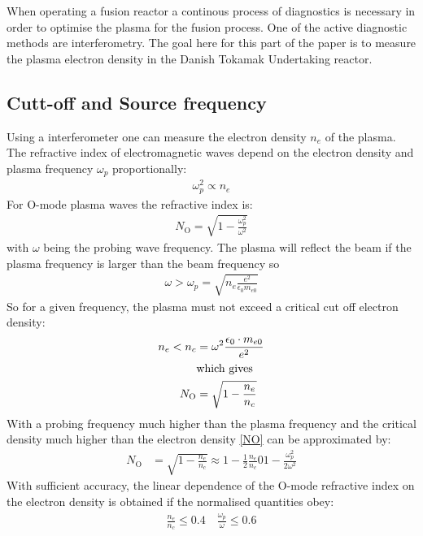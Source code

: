 When operating a fusion reactor a continous process of diagnostics is necessary in order to optimise the plasma for the fusion process. One of the active diagnostic methods are interferometry.
The goal here for this part of the paper is to measure the plasma electron density in the Danish Tokamak Undertaking reactor.
\subsection{Cutt-off and Source frequency}
Using a interferometer one can measure the electron density \(n_e\) of the plasma. The refractive index of electromagnetic waves depend on the electron density and plasma frequency \(\omega_p\) proportionally:
\begin{align}
	\omega_p^2 \propto n_e
\end{align}
For O-mode plasma waves the refractive index is:
\begin{align}
	N_{\mathrm{O}} = \sqrt{1-\frac{\omega_p^2}{\omega^2}}
\end{align}
with \(\omega\) being the probing wave frequency.
The plasma will reflect the beam if the plasma frequency is larger than the beam frequency so
\begin{align}
	\omega > \omega_p = \sqrt{n_e\frac{e^2}{\epsilon_0 m_{e0}}}
\end{align}
So for a given frequency, the plasma must not exceed a critical cut off electron density:
\begin{align}
	n_e < n_c      & = \omega^2\frac{\epsilon_0\cdot m_{e0}}{e^2} \label{nenc} \\
	               & \qq*{which gives} \nonumber                               \\
	N_{\mathrm{O}} & = \sqrt{1-\frac{n_e}{n_c}}\label{NO}
\end{align}
With a probing frequency much higher than the plasma frequency and the critical density much higher than the electron density \cref{NO} can be approximated by:
\begin{align}
	N_{\mathrm{O}} & = \sqrt{1-\frac{n_e}{n_c}} \approx 1-\frac{1}{2}\frac{n_e}{n_c} 0 1-\frac{\omega_p^2}{2\omega^2}
\end{align}
With sufficient accuracy, the linear dependence of the O-mode refractive index on the electron density is obtained if the normalised quantities obey:
\begin{align}
	\frac{n_e}{n_c} \leq 0.4 \quad \frac{\omega_p}{\omega} \leq 0.6
\end{align}
